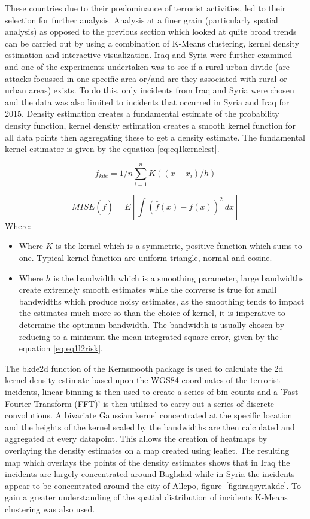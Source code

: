These countries due to their predominance of terrorist activities, led to their selection for further analysis. Analysis at a finer grain (particularly spatial analysis) as opposed to the previous section which looked at quite broad trends can be carried out by using a combination of K-Means clustering, kernel density estimation and interactive visualization. Iraq and Syria were further examined  and one of the experiments undertaken was to see if a  rural urban divide (are attacks focussed in one specific area or/and are they associated with rural or urban areas) exists. To do this, only incidents from Iraq and Syria were chosen and the data was also limited to incidents that occurred in Syria and Iraq for 2015. 
Density estimation creates a fundamental estimate of the probability density function, kernel density estimation creates a smooth kernel function for all data points then aggregating these to get a density estimate. The fundamental kernel estimator is given by the equation \ref{eq:eq1kernelest}.

\begin{equation} \hat{f}_{kde} = 1/n \sum^n_{i=1} K((x-x_i)/h) \label{eq:eq1kernelest}  \end{equation}

\begin{equation} MISE(\hat{f})=E[\int(\hat{f}(x)-f(x))^2 \ dx]
\label{eq:eq1l2risk}  \end{equation}
Where:
\begin{itemize}
\item[]  Where $K$ is the kernel which is a symmetric, positive function which sums to one. Typical kernel function are uniform triangle, normal and cosine.
\item[]  Where $h$ is the bandwidth which is a smoothing parameter, large bandwidths create extremely smooth estimates while the  converse is true for small bandwidths which produce noisy estimates, as the smoothing tends to impact the estimates much more so than the choice of kernel, it is imperative to determine the optimum bandwidth. The bandwidth is usually chosen by reducing to a minimum the mean integrated square error, given by the equation \ref{eq:eq1l2risk}.
\end{itemize}

The bkde2d function of the Kernsmooth package is used to calculate the 2d kernel density estimate based upon the WGS84 coordinates of the terrorist incidents, linear binning is then used to create a series of bin counts and a 'Fast Fourier Transform (FFT)' is then utilized to carry out a series of discrete convolutions. A bivariate Gaussian kernel concentrated at the specific location and the heights of the kernel scaled by the bandwidths are then calculated and aggregated at every datapoint. This allows the creation of heatmaps by overlaying the density estimates on a map created using leaflet. The resulting map which overlays the points of the density estimates shows that in Iraq the incidents are largely concentrated around Baghdad while in Syria the incidents appear to be concentrated around the city of Allepo, figure~\ref{fig:iraqsyriakde}. To gain a greater understanding of the spatial distribution of incidents K-Means clustering was also used.

